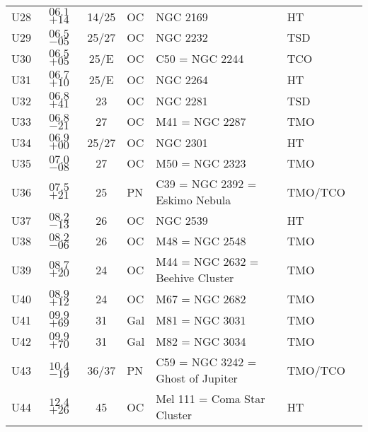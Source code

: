 \begin{table}[p]
\begin{tabular}{lccllll}
U28 &$06.1$ $+14$&14/25&OC &NGC 2169& HT  \\
U29 &$06.5$ $-05$&25/27&OC &NGC 2232& TSD \\
U30 &$06.5$ $+05$&25/E&OC &C50 = NGC 2244& TCO \\
U31 &$06.7$ $+10$&25/E&OC &NGC 2264& HT  \\
U32 &$06.8$ $+41$&23&OC &NGC 2281& TSD \\
U33 &$06.8$ $-21$&27&OC &M41 = NGC 2287& TMO \\
U34 &$06.9$ $+00$&25/27&OC &NGC 2301& HT  \\
U35 &$07.0$ $-08$&27&OC &M50 = NGC 2323& TMO \\
U36 &$07.5$ $+21$&25&PN &C39 = NGC 2392 = Eskimo Nebula& TMO/TCO \\
U37 &$08.2$ $-13$&26&OC &NGC 2539& HT  \\
U38 &$08.2$ $-06$&26&OC &M48 = NGC 2548& TMO \\
U39 &$08.7$ $+20$&24&OC &M44 = NGC 2632 = Beehive Cluster& TMO \\
U40 &$08.9$ $+12$&24&OC &M67 = NGC 2682& TMO \\
U41 &$09.9$ $+69$&31&Gal&M81 = NGC 3031& TMO \\
U42 &$09.9$ $+70$&31&Gal&M82 = NGC 3034& TMO \\
U43 &$10.4$ $-19$&36/37&PN &C59 = NGC 3242 = Ghost of Jupiter& TMO/TCO \\
U44 &$12.4$ $+26$&45&OC &Mel 111 = Coma Star Cluster& HT  \\\hline
\end{tabular}
\end{table}
\clearpage

